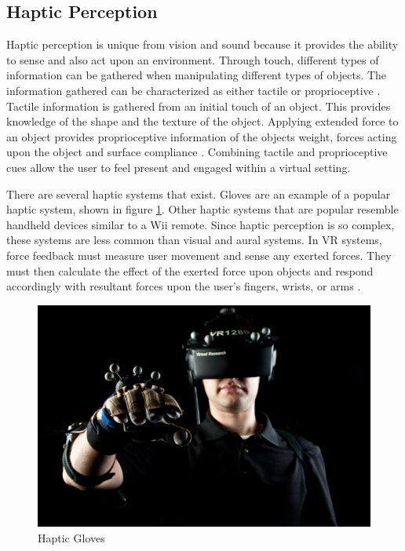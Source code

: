 \documentclass[12pt]{article}
\begin{document}
\subsection{Haptic Perception}
Haptic perception is unique from vision and sound because it provides the ability to sense and also act upon an environment.
 Through touch, different types of information can be gathered when manipulating different types of objects. The information gathered can be characterized as either tactile or proprioceptive \cite{gobbetti}. Tactile information is gathered from an initial touch of an object. This provides knowledge of the shape and the texture of the object. Applying extended force to an object provides proprioceptive information of the objects weight, forces acting upon the object and surface compliance \cite{gobbetti}. %
Combining tactile and proprioceptive cues allow the user to feel present and engaged within a virtual setting.

\par There are several haptic systems that exist. Gloves are an example of a popular haptic system, shown in figure \ref{fig:hapticPerception}. Other haptic systems that are popular resemble handheld devices similar to a Wii remote. Since haptic perception is so complex, these systems are less common than visual and aural systems. In VR systems, force feedback must measure user movement and sense any exerted forces. They must then calculate the effect of the exerted force upon objects and respond accordingly with resultant forces upon the user's fingers, wrists, or arms \cite{gobbetti}.

\begin{figure}[h]
    \centering
 \includegraphics[width=.55\textwidth]{picture12_haptics2}
  \caption{Haptic Gloves \cite{haptics}}
  \label{fig:hapticPerception}
 \end{figure}





\end{document}
